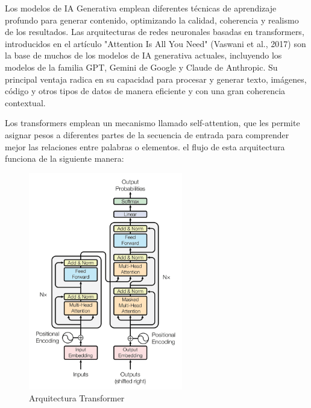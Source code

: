 Los modelos de IA Generativa emplean diferentes técnicas de aprendizaje profundo para generar contenido, optimizando la calidad, coherencia y realismo de los resultados.
Las arquitecturas de redes neuronales basadas en transformers, introducidos en el artículo "Attention Is All You Need" (Vaswani et al., 2017) \cite{vaswani2023attentionneed} son la base de muchos de los modelos de IA generativa actuales, incluyendo los modelos de la familia GPT, Gemini de Google y Claude de Anthropic. 
Su principal ventaja radica en su capacidad para procesar y generar texto, imágenes, código y otros tipos de datos de manera eficiente y con una gran coherencia contextual.

Los transformers emplean un mecanismo llamado self-attention, que les permite asignar pesos a diferentes partes de la secuencia de entrada para comprender mejor las relaciones entre palabras o elementos. el flujo de esta arquitectura funciona de la siguiente manera:

\begin{figure}[h]
	\centering
	\includegraphics[width=0.6\textwidth]{figs/transformer_arquitecture.png}
	\caption{Arquitectura Transformer}
	\label{fig:context-anoni1}
\end{figure}


